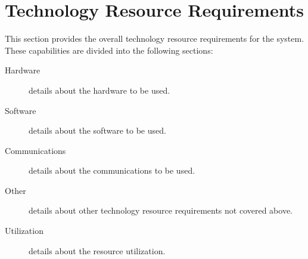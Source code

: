 \KNEADSECTIONNEWPAGE
\section{Technology Resource Requirements}
\label{lab:sec_TechnologyResourceRequirements}
% 

This section provides the overall technology resource requirements for the system. 
These capabilities are divided into the following sections:
\begin{description}
	\item[Hardware] details about the hardware to be used. 
	\item[Software] details about the software to be used.
	\item[Communications] details about the communications to be used.
	\item[Other] details about other technology resource requirements not covered above.
	\item[Utilization] details about the resource utilization.
\end{description}

